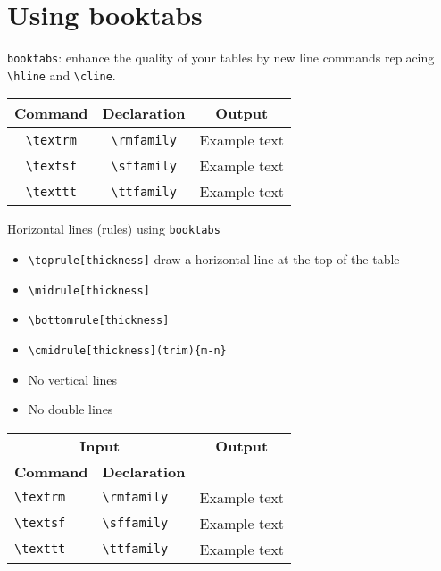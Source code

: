 \documentclass{article}
\newcommand{\head}[1]{\textnormal{\textbf{#1}}}
\newcommand{\bsl}[1]{\textbackslash#1}
\begin{document}
\section{Using booktabs} %
\label{sec:using_booktabs}

\texttt{booktabs}: enhance the quality of your tables by new line commands replacing \verb|\hline| and \verb|\cline|.

\begin{tabular}{ccc}
\toprule[1.5pt]
\head{Command} & \head{Declaration} & \head{Output}\\
\midrule
\verb|\textrm| & \verb|\rmfamily| & \rmfamily Example text\\
\verb|\textsf| & \verb|\sffamily| & \sffamily Example text\\
\verb|\texttt| & \verb|\ttfamily| & \ttfamily Example text\\
\bottomrule[1.5pt]
\end{tabular}


\noindent
Horizontal lines (rules) using \texttt{booktabs}
\begin{itemize}
  \item \texttt{\bsl{toprule}[thickness]} draw a horizontal line at the top of the table
  \item \texttt{\bsl{midrule}[thickness]}
  \item \texttt{\bsl{bottomrule}[thickness]}
  \item \texttt{\bsl{cmidrule}[thickness](trim)\{m-n\}}
  \item No vertical lines
  \item No double lines
\end{itemize}

\begin{tabular}{@{}*3l@{}}
\toprule[1.5pt]
\multicolumn{2}{c}{\head{Input}} &
  \multicolumn{1}{c}{\head{Output}}\\
\head{Command}  & \head{Declaration} & \\
\cmidrule(r){1-2} \cmidrule(l){3-3}
\verb|\textrm| & \verb|\rmfamily| & \rmfamily Example text\\
\verb|\textsf| & \verb|\sffamily| & \sffamily Example text\\
\verb|\texttt| & \verb|\ttfamily| & \ttfamily Example text\\
\bottomrule[1.5pt]
\end{tabular}
\end{document}
